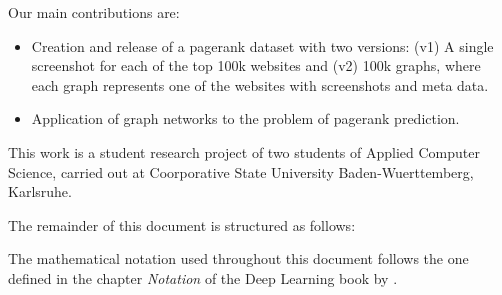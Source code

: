 Our main contributions are:
\begin{itemize}
\item Creation and release of a pagerank dataset with two versions: (v1) A single screenshot for each of the top 100k websites and (v2) 100k graphs, where each graph represents one of the websites with screenshots and meta data.
\item Application of graph networks to the problem of pagerank prediction.
\end{itemize}

This work is a student research project of two students of Applied Computer Science, carried out at Coorporative State University Baden-Wuerttemberg, Karlsruhe.

The remainder of this document is structured as follows: 

The mathematical notation used throughout this document follows the one defined in the chapter \textit{Notation} of the Deep Learning book by \cite{goodfellow:dlbook}.
